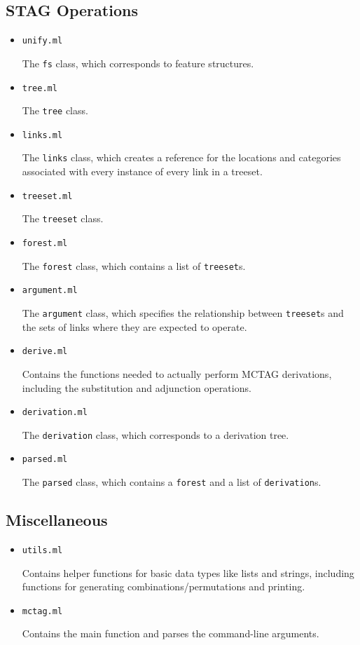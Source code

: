 \documentclass[10.5pt]{article}
\newcommand{\code}[1]{\texttt{#1}}
\begin{document}
\subsection{STAG Operations}
\begin{itemize}
	\item \code{unify.ml}

	The \code{fs} class, which corresponds to feature structures.
	\item \code{tree.ml}

	The \code{tree} class.
	\item \code{links.ml}

	The \code{links} class, which creates a reference for the locations and categories associated with every instance of every link in a treeset.
	\item \code{treeset.ml}

	The \code{treeset} class.
	\item \code{forest.ml}

	The \code{forest} class, which contains a list of \code{treeset}s.
	\item \code{argument.ml}

	The \code{argument} class, which specifies the relationship between \code{treeset}s and the sets of links where they are expected to operate.
	\item \code{derive.ml}

	Contains the functions needed to actually perform MCTAG derivations, including the substitution and adjunction operations.
	\item \code{derivation.ml}

	The \code{derivation} class, which corresponds to a derivation tree.
	\item \code{parsed.ml}

	The \code{parsed} class, which contains a \code{forest} and a list of \code{derivation}s.
\end{itemize}

\subsection{Miscellaneous}
\begin{itemize}
	\item \code{utils.ml}

	Contains helper functions for basic data types like lists and strings, including functions for generating combinations/permutations and printing.
	\item \code{mctag.ml}

	Contains the main function and parses the command-line arguments.
\end{itemize}
\end{document}
